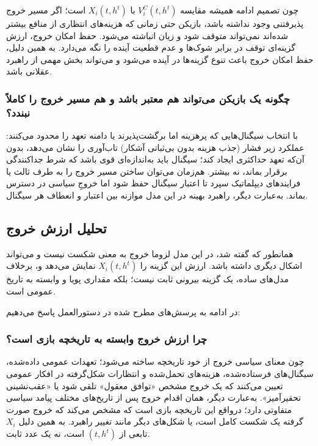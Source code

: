 \documentclass[12pt]{article}
\begin{document}
چون تصمیم ادامه همیشه مقایسه $V_i^C(t,h^t)$ با $X_i(t,h^t)$ است؛
اگر مسیر خروج پذیرفتنی وجود نداشته باشد،
بازیکن حتی زمانی که هزینه‌های انتظاری از منافع بیشتر شده‌اند نمی‌تواند متوقف شود
و زیان انباشته می‌شود.
حفظ امکان خروج، ارزش گزینه‌ای توقف در برابر شوک‌ها و عدم قطعیت آینده را نگه می‌دارد.
به همین دلیل، حفظ امکان خروج باعث تنوع گزینه‌ها در آینده می‌شود و 
می‌تواند بخش مهمی از راهبرد عقلانی باشد.

\subsubsection*{چگونه یک بازیکن می‌تواند هم معتبر باشد و هم مسیر خروج را کاملاً نبندد؟}

با انتخاب سیگنال‌هایی که پرهزینه اما برگشت‌پذیرند یا دامنه تعهد را محدود می‌کنند:
عملکرد زیر فشار (جذب هزینه بدون بی‌ثباتی آشکار) تاب‌آوری را نشان می‌دهد،
بدون آن‌که تعهد حداکثری ایجاد کند؛
سیگنال باید به‌اندازه‌ای قوی باشد که شرط جداکنندگی برقرار بماند، نه بیشتر.
هم‌زمان می‌توان ساختن مسیر خروج را به طرف ثالث یا فرایندهای دیپلماتیک سپرد
تا اعتبار سیگنال حفظ شود اما خروجِ سیاسی در دسترس بماند.
به‌عبارت دیگر، راهبرد بهینه در این مدل موازنه 
بین اعتبار و انعطاف هر سیگنال.

\subsection{تحلیل ارزش خروج}
همانطور که گفته شد، در این مدل لزوما 
خروج به معنی شکست نیست و می‌تواند اشکال دیگری داشته باشد.
ارزش این گزینه را $X_i(t,h^t)$ نمایش می‌دهد و، برخلاف مدل‌های ساده،
یک گزینه بیرونی ثابت نیست؛ بلکه مقداری پویا و وابسته به تاریخ عمومی است.

در ادامه به پرسش‌های مطرح شده در دستورالعمل پاسخ می‌دهیم:

\subsubsection*{چرا ارزش خروج وابسته به تاریخچه بازی است؟}

چون معنای سیاسی خروج از خود تاریخچه ساخته می‌شود؛
تعهدات عمومی داده‌شده، سیگنال‌های فرستاده‌شده، هزینه‌های تحمل‌شده
و انتظارات شکل‌گرفته در افکار عمومی تعیین می‌کنند که یک خروج مشخص
«توافق معقول» تلقی شود یا «عقب‌نشینی تحقیرآمیز».
به‌عبارت دیگر، همان اقدام خروج پس از تاریخ‌های مختلف پیامد سیاسی متفاوتی دارد؛
درواقع این تاریخچه بازی‌ است که مشخص می‌کند که خروج صورت گرفته یک شکست کامل است،
یا شکل‌های دیگر مانند تغییر راهبرد.
به همین دلیل
$X_i$ تابعی از $(t,h^t)$ است، نه یک عدد ثابت.
\end{document}
